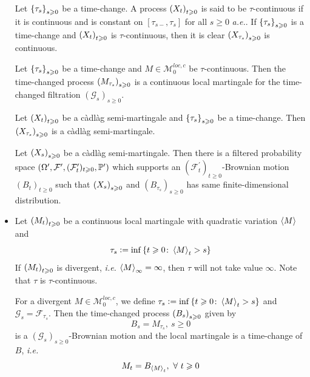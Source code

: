 \documentclass[a4paper,12pt]{article}
\begin{document}
\begin{itemize}
  \noindent Let $\left\{\tau_s\right\}_{s \geqslant 0}$ be a time-change. A process $\left(X_t\right)_{t \geqslant 0}$ is said to be $\tau$-continuous if it is continuous and is constant on $[\tau_{s-},\tau_s]$ for all $s \geqslant 0$ \emph{a.e.}. If $\left\{\tau_s\right\}_{s \geqslant 0}$ is a time-change and $\left(X_t\right)_{t \geqslant 0}$ is $\tau$-continuous, then it is clear $\left(X_{\tau_s}\right)_{s \geqslant 0}$ is continuous.

  \begin{prop}
     Let $\left\{\tau_s\right\}_{s \geqslant 0}$ be a time-change and $M \in \mathcal{M}_0^{loc,c}$ be $\tau$-continuous. Then the time-changed process $\left(M_{\tau_s}\right)_{s \geqslant 0}$ is a continuous local martingale for the time-changed filtration $(\mathcal{G}_s)_{s \geqslant 0}$.
  \end{prop}

  \begin{thm}
    Let $\left(X_t\right)_{t \geqslant 0}$ be a c\`adl\`ag semi-martingale and $\left\{\tau_s\right\}_{s \geqslant 0}$ be a time-change. Then $\left(X_{\tau_s}\right)_{s \geqslant 0}$ is a c\`adl\`ag semi-martingale.
  \end{thm}

  \begin{thm}
    Let  $\left(X_s\right)_{s \geqslant 0}$ be a c\`adl\`ag semi-martingale. Then there is a filtered probability space $(\Omega^{\prime},\mathcal{F}^{\prime},(\mathcal{F}^{\prime}_t)_{t \geqslant 0},\mathbb{P}^{\prime})$ which supports an $(\mathcal{F}^{\prime}_t)_{t \geqslant 0}$-Brownian motion $(B_t)_{t \geqslant 0}$ such that $\left(X_s\right)_{s \geqslant 0}$ and $(B_{\tau_s})_{s \geqslant 0}$ has same finite-dimensional distribution.
  \end{thm}

  \item Let $\left(M_t\right)_{t \geqslant 0}$ be a continuous local martingale with quadratic variation $\left\langle M \right\rangle$ and
  \begin{equation*}
    \tau_s \vcentcolon= \inf\left\{t \geqslant 0 \colon \left\langle M \right\rangle_t > s\right\}
  \end{equation*}
  If $\left(M_t\right)_{t \geqslant 0}$ is divergent, \emph{i.e.} $\left\langle M \right\rangle_{\infty} = \infty$, then $\tau$ will not take value $\infty$. Note that $\tau$ is $\tau$-continuous.

  \begin{thm}
    For a divergent $M \in \mathcal{M}_0^{loc,c}$, we define $\tau_s \vcentcolon= \inf\left\{t \geqslant 0 \colon \left\langle M \right\rangle_t > s\right\}$ and $\mathcal{G}_s = \mathcal{F}_{\tau_s}$. Then the time-changed process $\left(B_s\right)_{s\geqslant 0}$ given by
    \begin{equation*}
      B_s = M_{\tau_s},~s \geqslant 0
    \end{equation*}
    is a $(\mathcal{G}_s)_{s \geqslant 0}$-Brownian motion and the local martingale is a time-change of $B$, \emph{i.e.}
    \begin{equation*}
      M_t = B_{\left\langle M \right\rangle_t},~\forall~t \geqslant 0
    \end{equation*}
  \end{thm}


\end{itemize}
\end{document}
